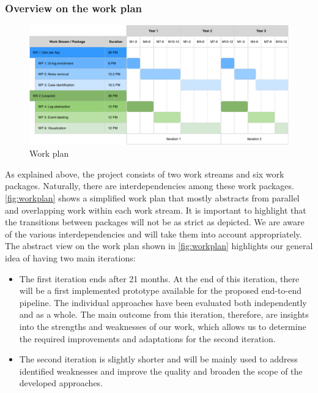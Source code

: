 \subsubsection{Overview on the work plan}

\begin{figure}[bt]
	\includegraphics[width=\textwidth]{Figures/Gantt.pdf}
	\caption{Work plan}
	\label{fig:workplan}
\end{figure}

As explained above, the project consists of two work streams and six work packages. Naturally, there are interdependencies among these work packages. \autoref{fig:workplan} shows a simplified work plan that mostly abstracts from parallel and overlapping work within each work stream. It is important to highlight that the transitions between packages will not be as strict as depicted. We are aware of the various interdependencies and will take them into account appropriately.  
The abstract view on the work plan shown in \autoref{fig:workplan} highlights our general idea of having two main iterations:
\begin{itemize}
	\item The first iteration ends after 21 months. At the end of this iteration, there will be a first implemented prototype available for the proposed end-to-end pipeline. The individual approaches have been evaluated both independently and as a whole. The main outcome from this iteration, therefore, are insights into the strengths and weaknesses of our work, which allows us to determine the required improvements and adaptations for the second iteration. 
	\item The second iteration is slightly shorter and will be mainly used to address identified weaknesses and improve the quality and broaden the scope of the developed approaches.
\end{itemize} 

